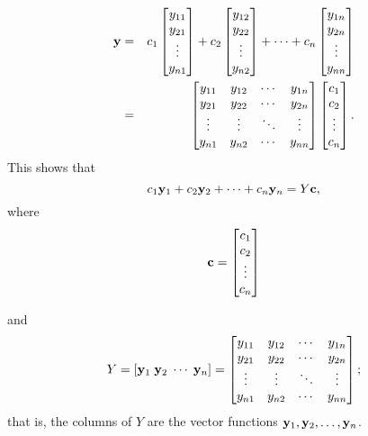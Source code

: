 \documentclass{ximera}
\begin{document}
\begin{eqnarray*}
{\bf y}&=&
c_1\begin{bmatrix} y_{11}\\y_{21}\\ \vdots\\
y_{n1}\end{bmatrix}+
c_2\begin{bmatrix} y_{12}\\y_{22}\\ \vdots\\
y_{n2}\end{bmatrix}+\cdots
+c_n\begin{bmatrix} y_{1n}\\y_{2n}\\ \vdots\\
y_{nn}\end{bmatrix}\\
&=&\begin{bmatrix}
y_{11}&y_{12}&\cdots&y_{1n} \\
y_{21}&y_{22}&\cdots&y_{2n}\\
\vdots&\vdots&\ddots&\vdots \\
y_{n1}&y_{n2}&\cdots&y_{nn} \\
\end{bmatrix}\begin{bmatrix}c_1\\c_2\\\vdots\\c_n\end{bmatrix}.
\end{eqnarray*}
This shows that
\begin{equation} \label{eq:10.3.3}
c_1{\bf y}_1+c_2{\bf y}_2+\cdots+c_n{\bf y}_n=Y{\bf c},
\end{equation}
where
$$
{\bf c}=\begin{bmatrix}c_1\\c_2\\\vdots\\c_n\end{bmatrix}
$$

and
\begin{equation} \label{eq:10.3.4}
Y=[{\bf y}_1\; {\bf y}_2\; \cdots\; {\bf y}_n]=
\begin{bmatrix}
y_{11}&y_{12}&\cdots&y_{1n} \\
y_{21}&y_{22}&\cdots&y_{2n}\\
\vdots&\vdots&\ddots&\vdots \\
y_{n1}&y_{n2}&\cdots&y_{nn} \\
\end{bmatrix};
\end{equation}
 that is, the columns of $Y$
are the vector functions ${\bf y}_1,{\bf y}_2,\dots,{\bf y}_n$.
\end{document}

